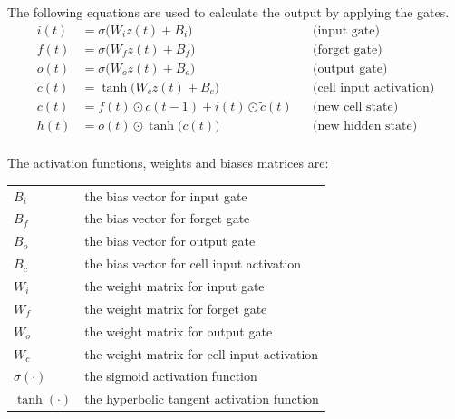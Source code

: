 \documentclass[a4paper,12pt]{report}
\begin{document}
\begin{minipage}{\textwidth}

The following equations are used to calculate the output by applying the gates.
\[
\begin{aligned}
  i(t) &= \sigma \big( W_i z(t) + B_i \big)  && \text{(input gate)} \\
  f(t) &= \sigma \big( W_f z(t) + B_f \big)  && \text{(forget gate)} \\
  o(t) &= \sigma \big( W_o z(t) + B_o \big)  && \text{(output gate)} \\
  \tilde{c}(t) &= \tanh \big( W_c z(t) + B_c \big) && \text{(cell input activation)} \\
  c(t) &= f(t) \odot c(t-1) + i(t) \odot \tilde{c}(t) && \text{(new cell state)} \\
  h(t) &= o(t) \odot \tanh \big( c(t) \big) && \text{(new hidden state)} \\
\end{aligned}
\]

\end{minipage}
\medskip
\begin{minipage}{\textwidth}
The activation functions, weights and biases matrices are:\\

\begin{tabularx}{\textwidth}{@{}l@{\hspace{2em}--\hspace{2em}}X@{}}
  $B_i$      & the bias vector for input gate \\
  $B_f$      & the bias vector for forget gate \\
  $B_o$      & the bias vector for output gate \\
  $B_c$      & the bias vector for cell input activation \\
  $W_i$      & the weight matrix for input gate \\
  $W_f$      & the weight matrix for forget gate \\
  $W_o$      & the weight matrix for output gate \\
  $W_c$      & the weight matrix for cell input activation \\
  $\sigma(\cdot)$ & the sigmoid activation function \\
  $\tanh(\cdot)$  & the hyperbolic tangent activation function \\
\end{tabularx}\\\\
\end{minipage}
\end{document}
